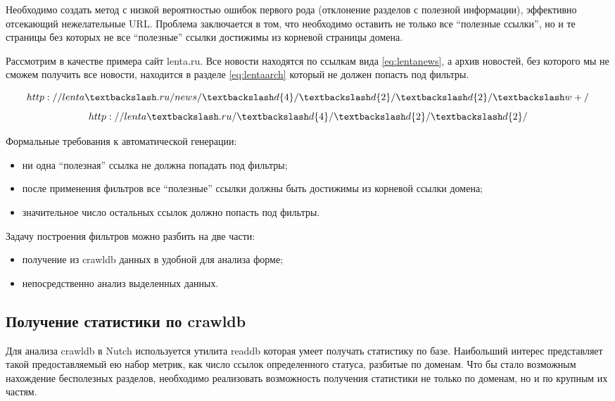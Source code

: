 Необходимо создать метод с низкой вероятностью ошибок первого рода (отклонение разделов с полезной информации), эффективно отсекающий нежелательные URL. Проблема заключается в том, что необходимо оставить не только все ``полезные ссылки'', но и те страницы без которых не все ``полезные'' ссылки достижимы из корневой страницы домена. 

Рассмотрим в качестве примера сайт lenta.ru. Все новости находятся по ссылкам вида \ref{eq:lentanews}, а архив новостей, без которого мы не сможем получить все новости, находится в разделе \ref{eq:lentaarch} который не должен попасть под фильтры.

\begin{equation}\label{eq:lentanews}
http://lenta\textbackslash.ru/news/\textbackslash d\{4\}/\textbackslash d\{2\}/\textbackslash d\{2\}/\textbackslash w+/
\end{equation}
\begin{equation}\label{eq:lentaarch}
 http://lenta\textbackslash.ru/\textbackslash d\{4\}/\textbackslash d\{2\}/\textbackslash d\{2\}/ 
\end{equation}

Формальные требования к автоматической генерации:
\begin{itemize}
 \item ни одна ``полезная'' ссылка  не должна попадать под фильтры;
 \item после применения фильтров все ``полезные'' ссылки должны быть достижимы из корневой ссылки домена;
 \item значительное число остальных ссылок должно попасть под фильтры.
\end{itemize}

Задачу построения фильтров можно разбить на две части:
\begin{itemize}
 \item получение из crawldb данных в удобной для анализа форме;
 \item непосредственно анализ выделенных данных.
\end{itemize}

\subsection{Получение статистики по crawldb}
Для анализа crawldb\cite{crawldbbib} в Nutch используется утилита readdb которая умеет получать статистику по базе. Наибольший интерес представляет такой предоставляемый ею набор метрик, как число ссылок определенного статуса, разбитые по доменам. Что бы стало возможным нахождение бесполезных разделов, необходимо реализовать возможность получения статистики не только по доменам, но и по крупным их частям.\cite{mrmine}

